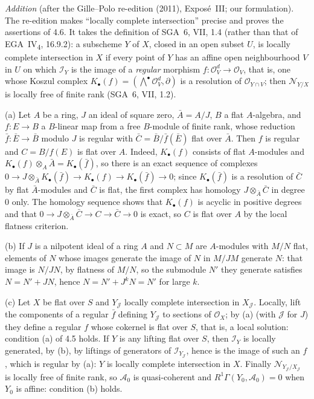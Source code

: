 \emph{Addition} (after the Gille--Polo re-edition (2011), Exposé~III; our
formulation). The re-edition makes ``locally complete intersection'' precise
and proves the assertions of 4.6. It takes the definition of SGA~6, VII, 1.4
(rather than that of EGA~IV\textsubscript{4}, 16.9.2): a subscheme \(Y\) of
\(X\), closed in an open subset \(U\), is locally complete intersection in
\(X\) if every point of \(Y\) has an affine open neighbourhood \(V\) in \(U\) on
which \(\mathscr I_Y\) is the image of a \emph{regular} morphism
\(f\colon\mathscr O_V^d\to\mathscr O_V\), that is, one whose Koszul complex
\(K_\bullet(f)=(\bigwedge^\bullet\mathscr O_V^d,\partial)\) is a resolution of
\(\mathscr O_{Y\cap V}\); then \(\mathscr N_{Y/X}\) is locally free of finite
rank (SGA~6, VII, 1.2).

(a) Let \(A\) be a ring, \(J\) an ideal of square zero, \(\bar A=A/J\), \(B\) a
flat \(A\)-algebra, and \(f\colon E\to B\) a \(B\)-linear map from a free
\(B\)-module of finite rank, whose reduction \(\bar f\colon\bar E\to\bar B\)
modulo \(J\) is regular with \(\bar C=\bar B/\bar f(\bar E)\) flat over \(\bar A\).
Then \(f\) is regular and \(C=B/f(E)\) is flat over \(A\). Indeed, \(K_\bullet(f)\)
consists of flat \(A\)-modules and \(K_\bullet(f)\otimes_A\bar A=K_\bullet(\bar f)\),
so there is an exact sequence of complexes \(0\to J\otimes_{\bar A}K_\bullet(\bar f)
\to K_\bullet(f)\to K_\bullet(\bar f)\to0\); since \(K_\bullet(\bar f)\) is a
resolution of \(\bar C\) by flat \(\bar A\)-modules and \(\bar C\) is flat, the first
complex has homology \(J\otimes_{\bar A}\bar C\) in degree \(0\) only. The homology
sequence shows that \(K_\bullet(f)\) is acyclic in positive degrees and that
\(0\to J\otimes_{\bar A}\bar C\to C\to\bar C\to0\) is exact, so \(C\) is flat
over \(A\) by the local flatness criterion.

(b) If \(J\) is a nilpotent ideal of a ring \(A\) and \(N\subset M\) are
\(A\)-modules with \(M/N\) flat, elements of \(N\) whose images generate the
image of \(N\) in \(M/JM\) generate \(N\): that image is \(N/JN\), by flatness
of \(M/N\), so the submodule \(N'\) they generate satisfies \(N=N'+JN\), hence
\(N=N'+J^kN=N'\) for large \(k\).

(c) Let \(X\) be flat over \(S\) and \(Y_{\mathscr J}\) locally complete
intersection in \(X_{\mathscr J}\). Locally, lift the components of a regular
\(\bar f\) defining \(Y_{\mathscr J}\) to sections of \(\mathscr O_X\); by (a)
(with \(\mathscr J\) for \(J\)) they define a regular \(f\) whose cokernel is
flat over \(S\), that is, a local solution: condition (a) of 4.5 holds. If \(Y\)
is any lifting flat over \(S\), then \(\mathscr I_Y\) is locally generated, by
(b), by liftings of generators of \(\mathscr I_{Y_{\mathscr J}}\), hence is the
image of such an \(f\), which is regular by (a): \(Y\) is locally complete
intersection in \(X\). Finally \(\mathscr N_{Y_{\mathscr J}/X_{\mathscr J}}\) is
locally free of finite rank, so \(\mathscr A_0\) is quasi-coherent and
\(R^1\Gamma(Y_0,\mathscr A_0)=0\) when \(Y_0\) is affine: condition (b) holds.

